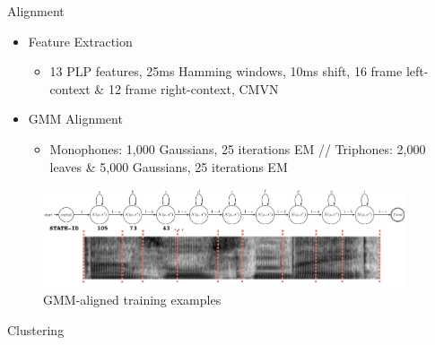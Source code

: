 \documentclass[final]{beamer} %
\newlength{\columnheight}
\begin{document}
\begin{frame}
\begin{columns}
\begin{column}{0.22\textwidth}
{        \vspace{.5cm}
      } %
    \end{column}

    \begin{column}{0.22\textwidth}
      \parbox[t][\columnheight]{.9\textwidth}{
        \vspace{.5cm}
        \begin{block}{\boxnumber Alignment}
          \begin{itemize}
          \item Feature Extraction
            \begin{itemize}
            \item 13 PLP features, 25ms Hamming windows, 10ms shift, 16 frame left-context \& 12 frame right-context, CMVN
            \end{itemize}
          \item GMM Alignment
            \begin{itemize}
            \item Monophones: 1,000 Gaussians, 25 iterations EM // Triphones: 2,000 leaves \& 5,000 Gaussians, 25 iterations EM
            \end{itemize}
          \end{itemize}
        \end{block}
  
        \vspace{.5cm}

        \begin{figure}[!htbp]
          \centering
          \includegraphics[width=\linewidth]{figs/aligned.png}
          \caption{GMM-aligned training examples}
          \endminipage\hfill
        \end{figure}
        
        \vspace{.5cm}
        
        \begin{block}{\boxnumber Clustering}
                    

\end{block}}
\end{column}
\end{columns}
\end{frame}
\end{document}
